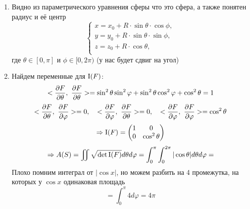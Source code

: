 \documentclass[main]{subfiles}
\begin{document}
    \begin{sol}
      \begin{enumerate}
        \item Видно из параметрического уравнения сферы что это сфера, а также понятен радиус и её центр
        \[\begin{cases}
          x = x_0 + R \cdot \sin \theta\cdot \cos \phi,\\
          y = y_0 + R \cdot \sin \theta\cdot \sin \phi,\\
          z = z_0 + R \cdot \cos \theta,\\
        \end{cases}\]
        где $\theta \in [0, \pi]$ и $\phi \in [0, 2\pi)$ (у нас будет сдвиг на угол)
        \item Найдем переменные для $\RNumb{1}(F)$:
        \[<\frac{\partial F}{\partial \theta},\ \frac{\partial F}{\partial \theta}> = \sin^2 \theta \sin^2 \varphi + \sin^2 \theta \cos^2 \varphi + \cos^2 \theta = 1\]
        \[<\frac{\partial F}{\partial \theta},\ \frac{\partial F}{\partial \varphi}> = 0,\quad <\frac{\partial F}{\partial \varphi},\ \frac{\partial F}{\partial \theta}> = 0,\quad <\frac{\partial F}{\partial \varphi},\ \frac{\partial F}{\partial \varphi}> = \cos^2 \theta\]
        \[\Ra \RNumb{1}(F)=\begin{pmatrix}
          1 & 0\\
          0 & \cos^2 \theta
        \end{pmatrix}\]
        \[\Ra A(S) = \iint \sqrt{\det \RNumb{1}(F)} d\theta d\varphi = \int_0^\pi \int_0^{2\pi} |\cos \theta|d\theta d\varphi =\]
        Плохо помним интеграл от $|\cos x|$, но можем разбить на 4 промежутка, на которых у $\cos x$ одинаковая площадь
        \[= \int_0^\pi 4 d\varphi = 4 \pi\]
      \end{enumerate}
    \end{sol}
\end{document}

